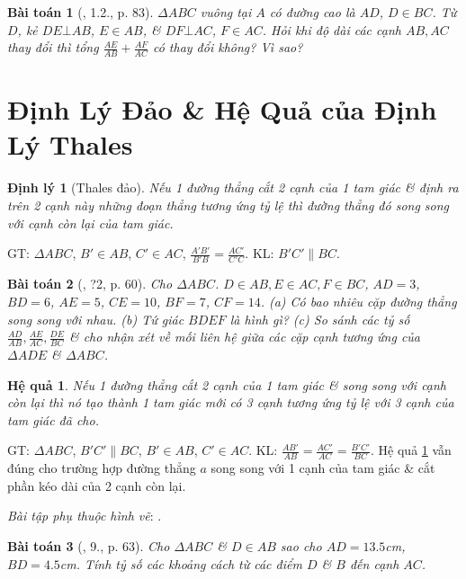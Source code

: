 \documentclass{article}
\newtheorem{baitoan}{Bài toán}
\newtheorem{dinhly}{Định lý}
\newtheorem{hequa}{Hệ quả}
\begin{document}
\begin{baitoan}[\cite{SBT_Toan_8_tap_2}, 1.2., p. 83]
	$\Delta ABC$ vuông tại $A$ có đường cao là $AD$, $D\in BC$. Từ $D$, kẻ $DE\bot AB$, $E\in AB$, \& $DF\bot AC$, $F\in AC$. Hỏi khi độ dài các cạnh $AB,AC$ thay đổi thì tổng $\frac{AE}{AB} + \frac{AF}{AC}$ có thay đổi không? Vì sao?
\end{baitoan}


\section{Định Lý Đảo \& Hệ Quả của Định Lý Thales}

\begin{dinhly}[Thales đảo]
	Nếu 1 đường thẳng cắt 2 cạnh của 1 tam giác \& định ra trên 2 cạnh này những đoạn thẳng tương ứng tỷ lệ thì đường thẳng đó song song với cạnh còn lại của tam giác.
\end{dinhly}
GT: $\Delta ABC$, $B'\in AB$, $C'\in AC$, $\frac{A'B'}{B'B} = \frac{AC'}{C'C}$. KL: $B'C'\parallel BC$.

\begin{baitoan}[\cite{SGK_Toan_8_tap_2}, ?2, p. 60]
	Cho $\Delta ABC$. $D\in AB,E\in AC,F\in BC$, $AD = 3$, $BD = 6$, $AE = 5$, $CE = 10$, $BF = 7$, $CF = 14$. (a) Có bao nhiêu cặp đường thẳng song song với nhau. (b) Tứ giác $BDEF$ là hình gì? (c) So sánh các tỷ số $\frac{AD}{AB},\frac{AE}{AC},\frac{DE}{BC}$ \& cho nhận xét về mối liên hệ giữa các cặp cạnh tương ứng của $\Delta ADE$ \& $\Delta ABC$.
\end{baitoan}

\begin{hequa}
	\label{col: Thales}
	Nếu 1 đường thẳng cắt 2 cạnh của 1 tam giác \& song song với cạnh còn lại thì nó tạo thành 1 tam giác mới có 3 cạnh tương ứng tỷ lệ với 3 cạnh của tam giác đã cho.
\end{hequa}
GT: $\Delta ABC$, $B'C'\parallel BC$, $B'\in AB$, $C'\in AC$. KL: $\frac{AB'}{AB} = \frac{AC'}{AC} = \frac{B'C'}{BC}$. Hệ quả \ref{col: Thales} vẫn đúng cho trường hợp đường thẳng $a$ song song với 1 cạnh của tam giác \& cắt phần kéo dài của 2 cạnh còn lại.

\textit{Bài tập phụ thuộc hình vẽ}: \cite[?3, 6.--8., pp. 62--63]{SGK_Toan_8_tap_2}.

\begin{baitoan}[\cite{SGK_Toan_8_tap_2}, 9., p. 63]
	Cho $\Delta ABC$ \& $D\in AB$ sao cho $AD = 13.5$\emph{cm}, $BD = 4.5$\emph{cm}. Tính tỷ số các khoảng cách từ các điểm $D$ \& $B$ đến cạnh $AC$.
\end{baitoan}
\end{document}
